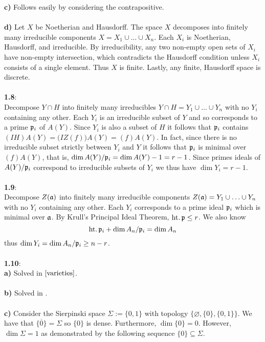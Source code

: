 \documentclass[12pt]{article}
\numberwithin{thm}{subsection}
\numberwithin{defn}{subsection}
\numberwithin{lemma}{subsection}
\numberwithin{example}{subsection}
\numberwithin{notation}{subsection}
\numberwithin{cor}{subsection}
\numberwithin{remark}{subsection}
\numberwithin{condition}{subsection}
\numberwithin{question}{subsection}
\numberwithin{construction}{subsection}
\numberwithin{construction}{subsection}
\numberwithin{construction}{subsection}
\begin{document}
%
\textbf{c)} Follows easily by considering the contrapositive.\\\\
%
\textbf{d)} Let $X$ be Noetherian and Hausdorff. The space $X$ decomposes into finitely many irreducible components $X = X_1 \cup \hdots \cup X_n$. Each $X_i$ is Noetherian, Hausdorff, and irreducible. By irreducibility, any two non-empty open sets of $X_i$ have non-empty intersection, which contradicts the Hausdorff condition unless $X_i$ consists of a single element. Thus $X$ is finite. Lastly, any finite, Hausdorff space is discrete.\\\\
%
\textbf{1.8}:\\
%
Decompose $Y \cap H$ into finitely many irreducibles $Y \cap H = Y_1 \cup ... \cup Y_n$ with no $Y_i$ containing any other. Each $Y_i$ is an irreducible subset of $Y$ and so corresponds to a prime $\frak{p}_i$ of $A(Y)$. Since $Y_i$ is also a subset of $H$ it follows that $\frak{p}_i$ contains $(IH)A(Y) = \big(IZ(f)\big)A(Y) = (f)A(Y)$. In fact, since there is no irreducible subset strictly between $Y_i$ and $Y$ it follows that $\frak{p}_i$ is minimal over $(f)A(Y)$, that is, $\operatorname{dim}A(Y)/\frak{p}_i = \operatorname{dim}A(Y) - 1 = r - 1$. Since primes ideals of $A(Y)/\frak{p}_i$ correspond to irreducible subsets of $Y_i$ we thus have $\operatorname{dim}Y_i = r-1$.\\\\
%
\textbf{1.9}:\\
%
Decompose $Z(\frak{a})$ into finitely many irreducible components $Z(\frak{a}) = Y_1 \cup \hdots \cup Y_n$ with no $Y_i$ containing any other. Each $Y_i$ corresponds to a prime ideal $\frak{p}_i$ which is minimal over $\frak{a}$. By Krull's Principal Ideal Theorem, $\operatorname{ht.}\frak{p} \leq r$. We also know
\[\operatorname{ht.}\frak{p}_i + \operatorname{dim}A_n/\frak{p}_i = \operatorname{dim}A_n\]
thus $\operatorname{dim}Y_i = \operatorname{dim}A_n/\frak{p}_i \geq n - r$.\\\\
%
\textbf{1.10}:\\
%
\textbf{a)} Solved in $\cite{varieties}$.\\\\
%
\textbf{b)} Solved in \cite{varieties}.\\\\
%
\textbf{c)} Consider the Sierpinski space $\Sigma := \lbrace 0,1\rbrace$ with topology $\big\lbrace \varnothing, \lbrace 0 \rbrace, \lbrace 0,1 \rbrace\big\rbrace$. We have that $\overline{\lbrace 0 \rbrace} = \Sigma$ so $\lbrace 0 \rbrace$ is dense. Furthermore, $\operatorname{dim}\lbrace 0 \rbrace = 0$. However, $\operatorname{dim}\Sigma = 1$ as demonstrated by the following sequence $\lbrace 0 \rbrace \subseteq \Sigma$.\\\\
\end{document}
